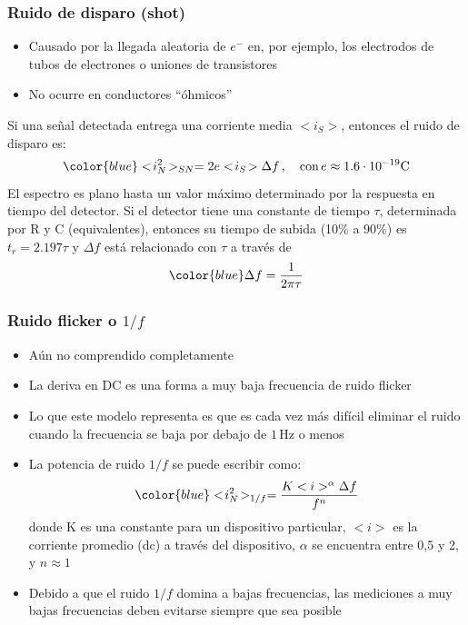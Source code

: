 \documentclass{beamer}
\begin{document}
\begin{frame}
\frametitle{Ruido de disparo (shot)}
\begin{alertblock}{}
\begin{itemize}
\item Causado por la llegada aleatoria de $e^-$ en, por ejemplo, los electrodos
de tubos de electrones o uniones de transistores

\item No ocurre en conductores ``óhmicos''
\end{itemize}
\end{alertblock}
Si una señal detectada entrega una corriente media $<\!i_S\!>$, entonces el
ruido de disparo es:
$${\color{blue}<\!i_N^2\!>_{SN} = 2e<\!i_S\!>\Delta f}\,, \quad \text{con}\, e \approx
1.6\cdot10^{-19}\text{C}$$
El espectro es plano hasta un valor máximo determinado por la respuesta en
tiempo del detector. Si el detector tiene una constante de tiempo $\tau$,
determinada por R y C (equivalentes), entonces su tiempo de subida (10\% a 90\%) es $t_r =
2.197\tau$ y $\Delta f$ está relacionado con $\tau$ a través de 
$${\color{blue}\Delta f = \frac{1}{2\pi\tau}}$$
\end{frame} 

\begin{frame}
\frametitle{Ruido flicker o $1/f$}
\begin{block}{}
\begin{itemize}
\item Aún no comprendido completamente
\item La deriva en DC es una forma a muy baja frecuencia de ruido flicker
\item Lo que este modelo representa es que es cada vez más difícil eliminar el
ruido cuando la frecuencia se baja por debajo de $1\,\text{Hz}$ o menos
\item La potencia de ruido $1/f$ se puede escribir como:
$${\color{blue}<\!i_N^2\!>_{1/f} = \frac{K<i>^\alpha\Delta f}{f^n}}$$
donde K es una constante para un dispositivo particular, $<\!i\!>$ es la
corriente promedio (dc) a través del dispositivo, $\alpha$ se encuentra entre
0,5 y 2, y $n \approx 1$
\item Debido a que el ruido $1/f$ domina a bajas frecuencias, las mediciones a muy
bajas frecuencias deben evitarse siempre que sea posible
\end{itemize}
\end{block}
\end{frame} 
\end{document}
